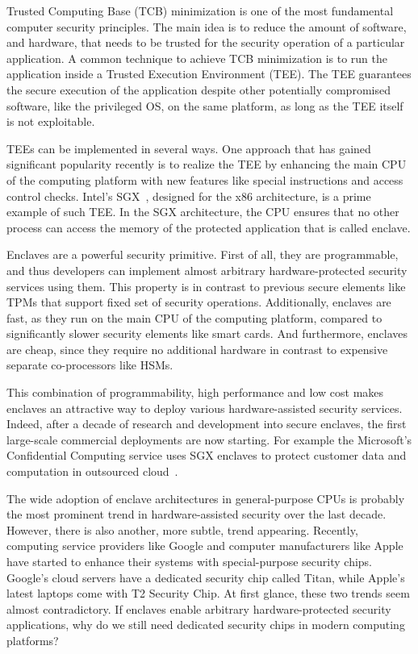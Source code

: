 
\vspace{10pt}

Trusted Computing Base (TCB) minimization is one of the most fundamental computer security principles. The main idea is to reduce the amount of software, and hardware, that needs to be trusted for the security operation of a particular application. A common technique to achieve TCB minimization is to run the application inside a Trusted Execution Environment (TEE). The TEE guarantees the secure execution of the application despite other potentially compromised software, like the privileged OS, on the same platform, as long as the TEE itself is not exploitable. 

TEEs can be implemented in several ways. One approach that has gained significant popularity recently is to realize the TEE by enhancing the main CPU of the computing platform with new features like special instructions and access control checks. Intel’s SGX~\cite{sgxexplained}, designed for the x86 architecture, is a prime example of such TEE. In the SGX architecture, the CPU ensures that no other process can access the memory of the protected application that is called enclave. 

Enclaves are a powerful security primitive. First of all, they are programmable, and thus developers can implement almost arbitrary hardware-protected security services using them. This property is in contrast to previous secure elements like TPMs that support fixed set of security operations. Additionally, enclaves are fast, as they run on the main CPU of the computing platform, compared to significantly slower security elements like smart cards. And furthermore, enclaves are cheap, since they require no additional hardware in contrast to expensive separate co-processors like HSMs. 

This combination of programmability, high performance and low cost makes enclaves an attractive way to deploy various hardware-assisted security services. Indeed, after a decade of research and development into secure enclaves, the first large-scale commercial deployments are now starting. For example the Microsoft’s Confidential Computing service uses SGX enclaves to protect customer data and computation in outsourced cloud~\cite{russinovich2017introducing}.

The wide adoption of enclave architectures in general-purpose CPUs is probably the most prominent trend in hardware-assisted security over the last decade. However, there is also another, more subtle, trend appearing. Recently, computing service providers like Google and computer manufacturers like Apple have started to enhance their systems with special-purpose security chips. Google’s cloud servers have a dedicated security chip called Titan, while Apple’s latest laptops come with T2 Security Chip. At first glance, these two trends seem almost contradictory. If enclaves enable arbitrary hardware-protected security applications, why do we still need dedicated security chips in modern computing platforms? 

